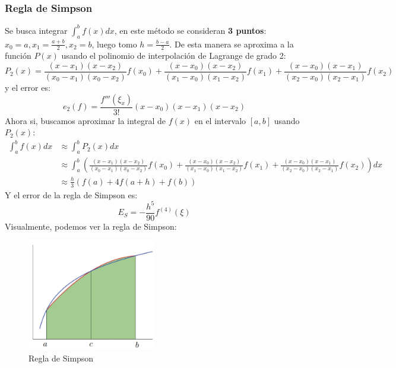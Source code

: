 \documentclass{article}
\begin{document}
\subsubsection{Regla de Simpson}
Se busca integrar $\int_{a}^{b} f(x) dx$, en este método se consideran \textbf{3 puntos}: $x_0=a, x_1=\frac{a+b}{2}, x_2=b$, luego tomo $h=\frac{b-a}{2}$. De esta manera se aproxima a la función $P(x)$ usando el polinomio de interpolación de Lagrange de grado 2:
\begin{equation}
    P_2(x) = \frac{(x-x_1)(x-x_2)}{(x_0-x_1)(x_0-x_2)}f(x_0) + \frac{(x-x_0)(x-x_2)}{(x_1-x_0)(x_1-x_2)}f(x_1) + \frac{(x-x_0)(x-x_1)}{(x_2-x_0)(x_2-x_1)}f(x_2)
\end{equation}
y el error es:
\begin{equation}
    e_2(f) = \frac{f'''(\xi_x)}{3!} (x-x_0)(x-x_1)(x-x_2)
\end{equation}
Ahora si, buscamos aproximar la integral de $f(x)$ en el intervalo $[a,b]$ usando $P_2(x)$:
\begin{align}
    \int_{a}^{b} f(x) dx &\approx \int_{a}^{b} P_2(x) dx \\
    &\approx \int_{a}^{b} \left( \frac{(x-x_1)(x-x_2)}{(x_0-x_1)(x_0-x_2)}f(x_0) + \frac{(x-x_0)(x-x_2)}{(x_1-x_0)(x_1-x_2)}f(x_1) + \frac{(x-x_0)(x-x_1)}{(x_2-x_0)(x_2-x_1)}f(x_2) \right) dx \\
    &\approx \frac{h}{3} (f(a) + 4f(a+h) + f(b))
\end{align}
Y el error de la regla de Simpson es:
\begin{equation}
    E_S = -\frac{h^5}{90} f^{(4)}(\xi)
\end{equation}
Visualmente, podemos ver la regla de Simpson:


\begin{figure}[h]
    \centering
    \includegraphics[width=0.5\textwidth]{images/simpson.png}
    \caption{Regla de Simpson}
    \label{fig:myplot18}
\end{figure}
\end{document}

